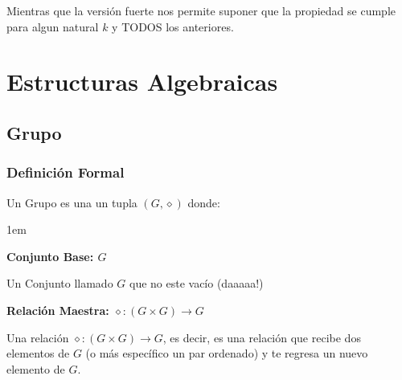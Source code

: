 \documentclass[12pt, fleqn]{report}                             %
\newenvironment{Indentation}[1][0.75em]                         %
        {\begin{adjustwidth}{#1}{}}                                 %
        {\end{adjustwidth}}                                         %
\theoremstyle{break}                                            %
\begin{document}
            Mientras que la versión fuerte nos permite suponer que la propiedad se cumple para algun natural
            $k$ y TODOS los anteriores.










    \chapter{Estructuras Algebraicas}
        \clearpage


        \clearpage
        \section{Grupo}

            \subsection{Definición Formal}

                Un Grupo es una un tupla $(G, \diamond)$ donde:
                \begin{Indentation}[1em]
                \begin{itemize}
                \small{
                    
                    \item
                        \textbf{Conjunto Base: $G$}

                        Un Conjunto llamado $G$ que no este vacío (daaaaa!)

                    \item
                        \textbf{Relación Maestra: $\diamond: (G \times  G) \to G$}

                        Una relación $\diamond: (G \times  G) \to G$, es decir, es una relación
                        que recibe dos elementos de $G$ (o más específico un par ordenado) y te
                        regresa un nuevo elemento de $G$.
                }
                \end{itemize}
                \end{Indentation}
\end{document}
